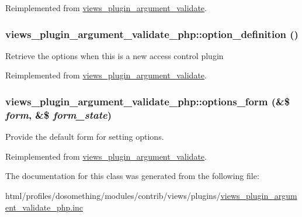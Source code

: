 Reimplemented from \hyperlink{classviews__plugin__argument__validate_a2de4a9571ea48105e195c483b13f5577}{views\_\-plugin\_\-argument\_\-validate}.\hypertarget{classviews__plugin__argument__validate__php_ac6bdb38c1985c81cc4cf6d5aac948378}{
\subsubsection[{option\_\-definition}]{\setlength{\rightskip}{0pt plus 5cm}views\_\-plugin\_\-argument\_\-validate\_\-php::option\_\-definition ()}}
\label{classviews__plugin__argument__validate__php_ac6bdb38c1985c81cc4cf6d5aac948378}
Retrieve the options when this is a new access control plugin 

Reimplemented from \hyperlink{classviews__plugin__argument__validate_aebc7a373a95a76ecb64345f558453b2d}{views\_\-plugin\_\-argument\_\-validate}.\hypertarget{classviews__plugin__argument__validate__php_a150a440c5cdcbad02d6cbd5916f9f0b7}{
\subsubsection[{options\_\-form}]{\setlength{\rightskip}{0pt plus 5cm}views\_\-plugin\_\-argument\_\-validate\_\-php::options\_\-form (\&\$ {\em form}, \/  \&\$ {\em form\_\-state})}}
\label{classviews__plugin__argument__validate__php_a150a440c5cdcbad02d6cbd5916f9f0b7}
Provide the default form for setting options. 

Reimplemented from \hyperlink{classviews__plugin__argument__validate_a619aac79800de4535d25fd93ce1f08cc}{views\_\-plugin\_\-argument\_\-validate}.

The documentation for this class was generated from the following file:\begin{DoxyCompactItemize}
\item 
html/profiles/dosomething/modules/contrib/views/plugins/\hyperlink{views__plugin__argument__validate__php_8inc}{views\_\-plugin\_\-argument\_\-validate\_\-php.inc}\end{DoxyCompactItemize}
